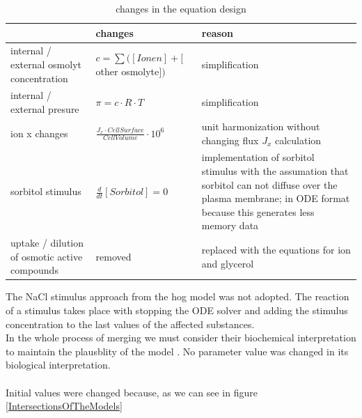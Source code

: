 \begin{table} [h]
	\footnotesize
\begin{center} 
	\caption{changes in the equation design}
\begin{tabular} {p{3.5cm} l p{6cm} }
\toprule
& changes & reason\\
\midrule
internal / external osmolyt concentration & $c = \sum ([Ionen]+[$other osmolyte$])$ & simplification\\ 
\addlinespace[9pt]
internal / external presure & $\pi = c \cdot R \cdot T	$ & simplification\\
\addlinespace[9pt]
ion x changes & $\frac{J_x \cdot CellSurface}{CellVolume} \cdot 10^{6}$ & unit harmonization without changing flux $J_x$ calculation\\
\addlinespace[9pt]
sorbitol stimulus & $\frac{d}{dt}[Sorbitol]=0$ & implementation of sorbitol stimulus with the assumation that sorbitol can not diffuse over the plasma membrane; in ODE format because this generates less memory data\\
\addlinespace[9pt]
uptake / dilution of osmotic active compounds & removed & replaced with the equations for ion and glycerol\\
\bottomrule
\end{tabular}
\label{changesOnTheModels}
\end{center}
\end{table}
The NaCl stimulus approach from the hog model was not adopted. The reaction of a stimulus takes place with stopping the ODE solver and adding the stimulus concentration to the last values of the affected substances.\\
In the whole process of merging we must consider their biochemical interpretation to maintain the plausblity of the model \cite{Liebermeister2008ValidityAC}. No parameter value was changed in its biological interpretation.\\\\
Initial values were changed because, as we can see in figure \ref{IntersectionsOfTheModels}


